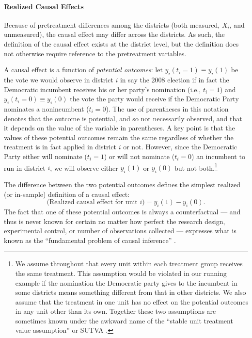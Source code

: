 \documentclass[11pt,titlepage]{article}
\begin{document}
\paragraph{Realized Causal Effects}
Because of pretreatment differences among the districts (both
measured, $X_i$, and unmeasured), the causal effect may differ across
the districts.  As such, the definition of the causal effect exists at
the district level, but the definition does not otherwise require
reference to the pretreatment variables.

A causal effect is a function of \emph{potential outcomes}: let
$y_i(t_i=1)\equiv y_i(1)$ be the vote we would observe in district $i$
in say the 2008 election if in fact the Democratic incumbent receives
his or her party's nomination (i.e., $t_i=1$) and $y_i(t_i=0)\equiv
y_i(0)$ the vote the party would receive if the Democratic Party
nominates a nonincumbent ($t_i=0$).  The use of parentheses in this
notation denotes that the outcome is potential, and so not necessarily
observed, and that it depends on the value of the variable in
parentheses.  A key point is that the values of these potential
outcomes remain the same regardless of whether the treatment is in
fact applied in district $i$ or not.  However, since the Democratic
Party either will nominate ($t_i=1$) or will not nominate ($t_i=0$) an
incumbent to run in district $i$, we will observe either $y_{i}(1)$ or
$y_{i}(0)$ but not both.\footnote{We assume throughout that every unit
  within each treatment group receives the same treatment.  This
  assumption would be violated in our running example if the
  nomination the Democratic party gives to the incumbent in some
  districts means something different from that in other districts.
  We also assume that the treatment in one unit has no effect on the
  potential outcomes in any unit other than its own.  Together these
  two assumptions are sometimes known under the awkward name of the
  ``stable unit treatment value assumption'' or SUTVA
  \citep{Rubin74}.}

The difference between the two potential outcomes defines the simplest
realized (or in-sample) definition of a causal effect:
\begin{equation}
  \label{rce}
  \text{(Realized causal effect for unit $i$)} = y_i(1) - y_i(0).
\end{equation}
The fact that one of these potential outcomes is always a
counterfactual --- and thus is never known for certain no matter how
perfect the research design, experimental control, or number of
observations collected --- expresses what is known as the
``fundamental problem of causal inference'' \citep{Holland86}.
\end{document}
